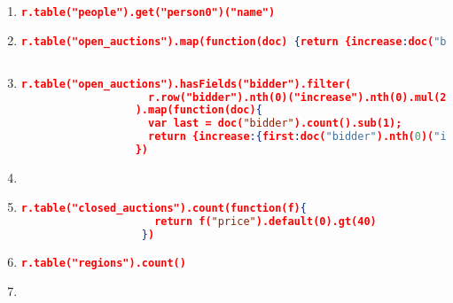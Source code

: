 \label{xmark-queries-rethindb}
\begin{enumerate}[label=Q\arabic*.]
	\item %
	
	\begin{lstlisting}[language=JSON]
		r.table("people").get("person0")("name")
	\end{lstlisting}

	\item %
	\begin{lstlisting}[language=JSON]
	r.table("open_auctions").map(function(doc) {return {increase:doc("bidder").nth(0)("increase").nth(0).default("")}})
	
	\end{lstlisting}
	
    \item %
	\begin{lstlisting}[language=JSON]
	  r.table("open_auctions").hasFields("bidder").filter(
	                r.row("bidder").nth(0)("increase").nth(0).mul(2).le(r.row("bidder").nth(r.row("bidder").count().sub(1))("increase").nth(0))
	              ).map(function(doc){
	                var last = doc("bidder").count().sub(1);
	                return {increase:{first:doc("bidder").nth(0)("increase").nth(0), last:doc("bidder").nth(last)("increase").nth(0)} }
	              })
	\end{lstlisting}
	
	
    \item %
	\begin{lstlisting}[language=JSON]
	   
	\end{lstlisting}
	
	
    \item %
	\begin{lstlisting}[language=JSON]
	   r.table("closed_auctions").count(function(f){
	                 return f("price").default(0).gt(40)
	               })
	\end{lstlisting}
	
    \item %
	\begin{lstlisting}[language=JSON]
	   r.table("regions").count()
	\end{lstlisting}
	
	
    \item %
	\begin{lstlisting}[language=JSON]
	   
	\end{lstlisting}
	

\end{enumerate}
